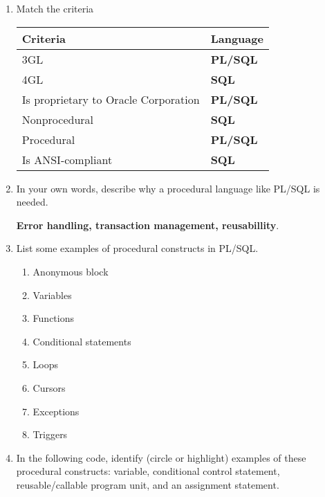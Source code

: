 \documentclass[11pt]{article}
\begin{document}
\begin{enumerate}
\item Match the criteria

\begin{center}
\begin{tabular}{ll}
Criteria & Language\\[0pt]
\hline
3GL & \textbf{PL/SQL}\\[0pt]
4GL & \textbf{SQL}\\[0pt]
Is proprietary to Oracle Corporation & \textbf{PL/SQL}\\[0pt]
Nonprocedural & \textbf{SQL}\\[0pt]
Procedural & \textbf{PL/SQL}\\[0pt]
Is ANSI-compliant & \textbf{SQL}\\[0pt]
\end{tabular}
\end{center}

\item In your own words, describe why a procedural language like PL/SQL is needed.

\textbf{Error handling, transaction management, reusabillity}.

\item List some examples of procedural constructs in PL/SQL.

\begin{enumerate}
\item Anonymous block

\item Variables

\item Functions

\item Conditional statements

\item Loops

\item Cursors

\item Exceptions

\item Triggers
\end{enumerate}

\item In the following code, identify (circle or highlight) examples of these
procedural constructs: variable, conditional control statement,
reusable/callable program unit, and an assignment statement.


\end{enumerate}
\end{document}
